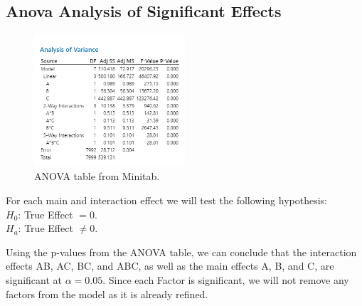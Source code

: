 \documentclass{article}
\begin{document}
\subsection{Anova Analysis of Significant Effects}
  \begin{figure}[h] %
    \centering
    \includegraphics[width=0.5\textwidth]{./images/anova.png}
    \caption{ANOVA table from Minitab.}
    \label{fig:anova}
  \end{figure}
  \begin{flushleft}
    For each main and interaction effect we will test the following hypothesis:\\

    $H_0$: True Effect $= 0$.\\
    $H_a$: True Effect $\neq 0$.\\
  \end{flushleft}
    \begin{flushleft}
      Using the p-values from the ANOVA table, we can conclude that the interaction effects AB, AC, BC, and ABC, as well as the main effects A, B, and C, are significant at $\alpha = 0.05$.
      Since each Factor is significant, we will not remove any factors from the model as it is already refined.
    \end{flushleft}
\end{document}
